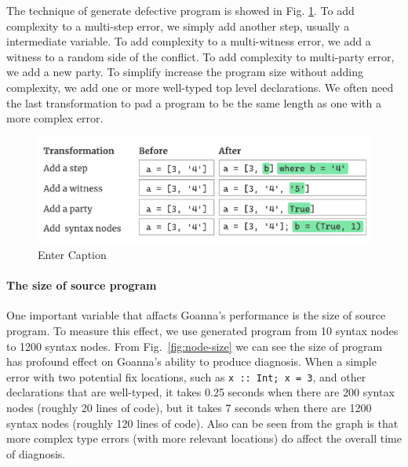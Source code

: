 \documentclass[pdflatex,sn-mathphys-num]{sn-jnl}%
\begin{document}
    The technique of generate defective program is showed in Fig. \ref{fig:error-generation}. To add complexity to a multi-step error, we simply add another step, usually a intermediate variable. To add complexity to a multi-witness error, we add a witness to a random side of the conflict. To add complexity to multi-party error, we add a new party. To simplify increase the program size without adding complexity, we add one or more well-typed top level declarations. We often need the last transformation to pad a program to be the same length as one with a more complex error.

    
    \begin{figure}
        \centering
        \includegraphics[width=0.5\linewidth]{images/evaluation-generating-errors.pdf}
        \caption{Enter Caption}
        \label{fig:error-generation}
    \end{figure}

    

    \paragraph{\textbf{The size of source program}}

    One important variable that affacts Goanna's performance is the size of source program. To measure this effect, we use generated program from 10 syntax nodes to 1200 syntax nodes. From Fig.~\ref{fig:node-size} we can see the size of program has profound effect on Goanna's ability to produce diagnosis. When a simple error with two potential fix locations, such as \texttt{x :: Int; x = 3}, and other declarations that are well-typed, it takes 0.25 seconds when there are 200 syntax nodes (roughly 20 lines of code), but it takes 7 seconds when there are 1200 syntax nodes (roughly 120 lines of code). Also can be seen from the graph is that more complex type errors (with more relevant locations) do affect the overall time of diagnosis. 
\end{document}
